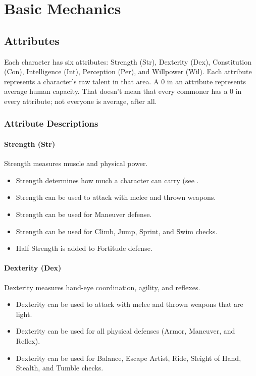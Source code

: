 \chapter{Basic Mechanics}

\section{Attributes}
Each character has six attributes: Strength (Str), Dexterity (Dex), Constitution (Con), Intelligence (Int), Perception (Per), and Willpower (Wil). Each attribute represents a character's raw talent in that area. A 0 in an attribute represents average human capacity. That doesn't mean that every commoner has a 0 in every attribute; not everyone is average, after all.

\subsection{Attribute Descriptions}

\subsubsection{Strength (Str)}
Strength measures muscle and physical power.
\begin{itemize}
    \item Strength determines how much a character can carry (see .
    \item Strength can be used to attack with melee and thrown weapons.
    \item Strength can be used for Maneuver defense.
    \item Strength can be used for Climb, Jump, Sprint, and Swim checks.
    \item Half Strength is added to Fortitude defense.
\end{itemize}

\subsubsection{Dexterity (Dex)}
Dexterity measures hand-eye coordination, agility, and reflexes.
\begin{itemize}
    \item Dexterity can be used to attack with melee and thrown weapons that are light.
    \item Dexterity can be used for all physical defenses (Armor, Maneuver, and Reflex).
    \item Dexterity can be used for Balance, Escape Artist, Ride, Sleight of Hand, Stealth, and Tumble checks.
\end{itemize}

